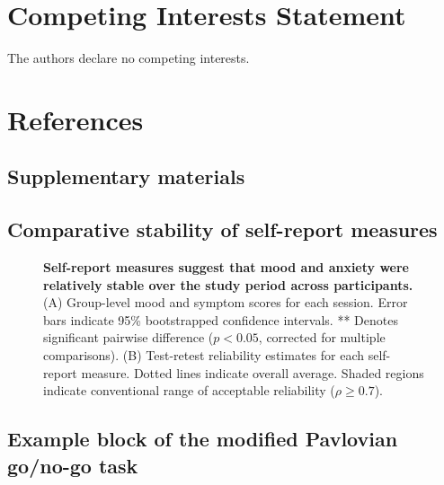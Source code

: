 \documentclass[a4paper,12pt]{article}
\begin{document}
\begin{refsection}[main]
\section*{Competing Interests Statement}

The authors declare no competing interests.

\break
\section*{References}
\printbibliography[heading=main]
\end{refsection}

\break
\begin{refsection}[supp]
\section*{Supplementary materials}
\setcounter{figure}{0}
\setcounter{table}{0}
\renewcommand{\thetable}{S\arabic{table}}
\renewcommand{\thefigure}{S\arabic{figure}}

\subsection*{Comparative stability of self-report measures}

\begin{figure}[h]
    \centerline{}
    \caption{{\bf Self-report measures suggest that mood and anxiety were relatively stable over the study period across participants.} (A) Group-level mood and symptom scores for each session. Error bars indicate 95\% bootstrapped confidence intervals. ** Denotes significant pairwise difference ($p < 0.05$, corrected for multiple comparisons). (B) Test-retest reliability estimates for each self-report measure. Dotted lines indicate overall average. Shaded regions indicate conventional range of acceptable reliability ($\rho \geq 0.7$).}
    \label{fig:figS05}
\end{figure}

\break
\subsection*{Example block of the modified Pavlovian go/no-go task}


\end{refsection}
\end{document}

